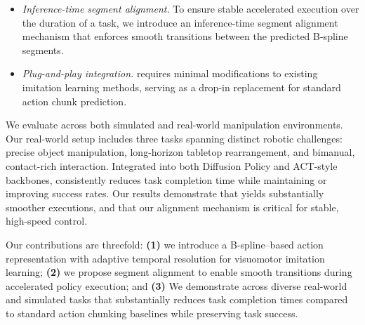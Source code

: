 \vspace{-10pt}

\begin{itemize}[leftmargin=3mm]
    \item \textit{Inference-time segment alignment.} 
    To ensure stable accelerated execution over the duration of a task, we introduce an inference-time segment alignment mechanism that enforces smooth transitions between the predicted B-spline segments.
\end{itemize}

\vspace{-10pt}

\begin{itemize}[leftmargin=3mm]
    \item \textit{Plug-and-play integration.} 
    \our requires minimal modifications to existing imitation learning methods, serving as a drop-in replacement for standard action chunk prediction.
\end{itemize}

We evaluate \our across both simulated and real-world manipulation environments. Our real-world setup includes three tasks spanning distinct robotic challenges: precise object manipulation, long-horizon tabletop rearrangement, and bimanual, contact-rich interaction. Integrated into both Diffusion Policy and ACT-style backbones, \our consistently reduces task completion time while maintaining or improving success rates. Our results demonstrate that \our yields substantially smoother executions, and that our alignment mechanism is critical for stable, high-speed control.

Our contributions are threefold: \textbf{(1)} we introduce a B‑spline–based action representation with adaptive temporal resolution for visuomotor imitation learning; \textbf{(2)} we propose segment alignment to enable smooth transitions during accelerated policy execution; and \textbf{(3)} We demonstrate across diverse real-world and simulated tasks that \our substantially reduces task completion times compared to standard action chunking baselines while preserving task success.



